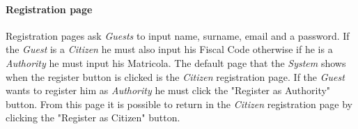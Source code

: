 \documentclass{article}
\begin{document}
\paragraph{Registration page}
Registration pages ask \textit{Guests} to input name, surname, email and a password. If the \textit{Guest} is a \textit{Citizen}
he must also input his Fiscal Code otherwise if he is a \textit{Authority} he must input his Matricola. The default page that the 
\textit{System} shows when the register button is clicked is the \textit{Citizen} registration page. If the \textit{Guest} wants
to register him as \textit{Authority} he must click the "Register as Authority" button. From this page it is possible
to return in the \textit{Citizen} registration page by clicking the "Register as Citizen" button.   
\\
\\
\\
\\
\end{document}

